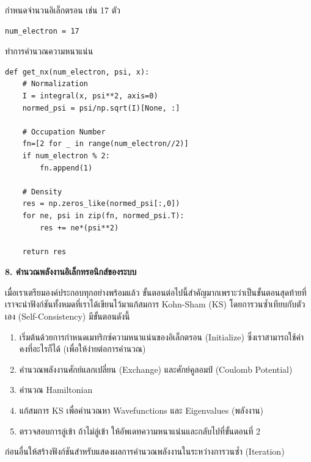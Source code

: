 \noindent กำหนดจำนวนอิเล็กตรอน เช่น 17 ตัว

\begin{lstlisting}[style=MyPython]
num_electron = 17
\end{lstlisting}

\vspace{5pt}

\noindent ทำการคำนวณความหนาแน่น

\begin{lstlisting}[style=MyPython]
def get_nx(num_electron, psi, x):
    # Normalization
    I = integral(x, psi**2, axis=0)
    normed_psi = psi/np.sqrt(I)[None, :]
    
    # Occupation Number
    fn=[2 for _ in range(num_electron//2)]
    if num_electron % 2:
        fn.append(1)

    # Density
    res = np.zeros_like(normed_psi[:,0])
    for ne, psi in zip(fn, normed_psi.T):
        res += ne*(psi**2)

    return res
\end{lstlisting}

\vspace{5pt}

\noindent \textbf{8. คำนวณพลังงานอิเล็กทรอนิกส์ของระบบ}

เมื่อเราเตรียมองค์ประกอบทุกอย่างพร้อมแล้ว ขั้นตอนต่อไปนี้สำคัญมากเพราะว่าเป็นขั้นตอนสุดท้ายที่เราจะนำฟังก์ชันทั้งหมดที่เราได้เขียนไว้มาแก้สมการ Kohn-Sham (KS) โดยการวนซ้ำเทียบกับตัวเอง (Self-Consistency) มีขั้นตอนดังนี้

\begin{enumerate}[topsep=0pt,noitemsep]
  \setlength\itemsep{0.5em}
  \item เริ่มต้นด้วยการกำหนดเมทริกซ์ความหนาแน่นของอิเล็กตรอน (Initialize) ซึ่งเราสามารถใช้ค่าคงที่อะไรก็ได้ (เพื่อให้ง่ายต่อการคำนวณ)

  \item คำนวณพลังงานศักย์แลกเปลี่ยน (Exchange) และศักย์คูลอมป์ (Coulomb Potential)

  \item คำนวณ Hamiltonian

  \item แก้สมการ KS เพื่อคำนวณหา Wavefunctions และ Eigenvalues (พลังงาน)

  \item ตรวจสอบการลู่เข้า ถ้าไม่ลู่เข้า ให้อัพเดทความหนาแน่นและกลับไปที่ขั้นตอนที่ 2
\end{enumerate}

ก่อนอื่นให้สร้างฟังก์ชันสำหรับแสดงผลการคำนวณพลังงานในระหว่างการวนซ้ำ (Iteration)

